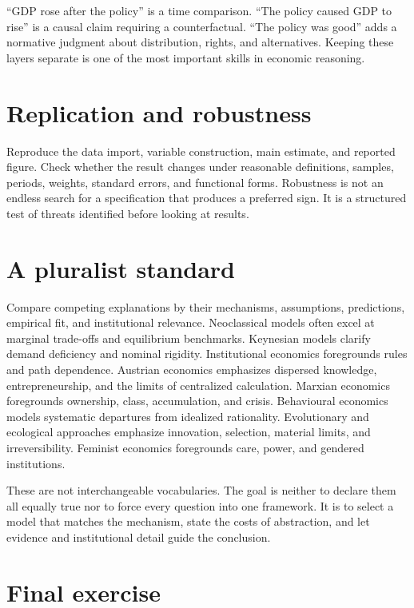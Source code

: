\documentclass[11pt,oneside,openany]{book}
\begin{document}
``GDP rose after the policy'' is a time comparison. ``The policy caused GDP to rise'' is a causal claim requiring a counterfactual. ``The policy was good'' adds a normative judgment about distribution, rights, and alternatives. Keeping these layers separate is one of the most important skills in economic reasoning.

\section{Replication and robustness}

Reproduce the data import, variable construction, main estimate, and reported figure. Check whether the result changes under reasonable definitions, samples, periods, weights, standard errors, and functional forms. Robustness is not an endless search for a specification that produces a preferred sign. It is a structured test of threats identified before looking at results.

\section{A pluralist standard}

Compare competing explanations by their mechanisms, assumptions, predictions, empirical fit, and institutional relevance. Neoclassical models often excel at marginal trade-offs and equilibrium benchmarks. Keynesian models clarify demand deficiency and nominal rigidity. Institutional economics foregrounds rules and path dependence. Austrian economics emphasizes dispersed knowledge, entrepreneurship, and the limits of centralized calculation. Marxian economics foregrounds ownership, class, accumulation, and crisis. Behavioural economics models systematic departures from idealized rationality. Evolutionary and ecological approaches emphasize innovation, selection, material limits, and irreversibility. Feminist economics foregrounds care, power, and gendered institutions.

These are not interchangeable vocabularies. The goal is neither to declare them all equally true nor to force every question into one framework. It is to select a model that matches the mechanism, state the costs of abstraction, and let evidence and institutional detail guide the conclusion.

\section{Final exercise}
\end{document}
